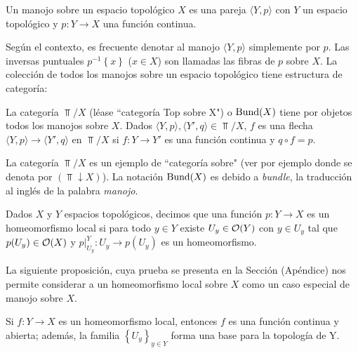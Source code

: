 \begin{Def}[Manojo]
    Un manojo sobre un espacio topológico $X$ es una pareja $\langle Y, p\rangle$ con $Y$ un espacio topológico y $p:Y\to X$ una función continua.
\end{Def}
Según el contexto, es frecuente denotar al manojo $\langle Y,p\rangle$ simplemente por $p$. Las inversas puntuales $p^{-1}\left\lbrace x\right\rbrace$ ($x\in X$) son llamadas las fibras de $p$ sobre $X$. La colección de todos los manojos sobre un espacio topológico tiene estructura de categoría:
\begin{Def}
   La categoría $\Top /X$ (léase ``categoría Top sobre X") o $\normalfont{\text{Bund}} (X)$ tiene por objetos todos los manojos sobre $X$. Dados $\langle Y,p\rangle,\langle Y',q\rangle\in \Top/X$, $f$ es una flecha $\langle Y,p\rangle\to\langle Y',q\rangle$ en $\Top/X$ si $f:Y\to Y'$ es una función continua y $q\circ f=p$.
   
\end{Def}
La categoría $\Top /X$ es un ejemplo de ``categoría sobre" (ver por ejemplo \cite[p.~45]{CWM} donde se denota por $(\Top\downarrow X)$). La notación $\normalfont{\text{Bund}} (X)$ es debido a \textit{bundle}, la traducción al inglés de la palabra \textit{manojo}. 
\begin{Def}
   Dados $X$ y $Y$ espacios topológicos, decimos que una función $p:Y\to X$ es un homeomorfismo local si para todo $y\in Y$ existe $U_y\in\mathcal{O} (Y)$ con $y\in U_y$ tal que $p(U_y)\in\mathcal{O} (X)$ y $p|^{Y}_{U_y}:U_y\to p(U_y)$ es un homeomorfismo. 
\end{Def}
La siguiente proposición, cuya prueba se presenta en la Sección  (Apéndice) nos permite considerar a un homeomorfismo local sobre $X$ como un caso especial de manojo sobre $X$.
\begin{Prop}
   Si $f:Y\to X$ es un homeomorfismo local, entonces $f$ es una función continua y abierta; además, la familia $\left\lbrace U_y\right\rbrace_{y\in Y}$ forma una base para la topología de Y.
\end{Prop}
